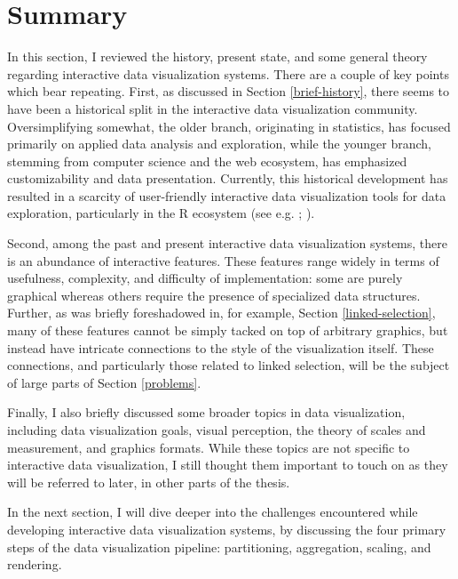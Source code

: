 \documentclass[
  openany]{book}
\theoremstyle{definition}
\theoremstyle{definition}
\theoremstyle{definition}
\theoremstyle{definition}
\theoremstyle{remark}
\begin{document}
\section{Summary}\label{summary}

In this section, I reviewed the history, present state, and some general theory regarding interactive data visualization systems. There are a couple of key points which bear repeating. First, as discussed in Section \ref{brief-history}, there seems to have been a historical split in the interactive data visualization community. Oversimplifying somewhat, the older branch, originating in statistics, has focused primarily on applied data analysis and exploration, while the younger branch, stemming from computer science and the web ecosystem, has emphasized customizability and data presentation. Currently, this historical development has resulted in a scarcity of user-friendly interactive data visualization tools for data exploration, particularly in the R ecosystem (see e.g. ; ).

Second, among the past and present interactive data visualization systems, there is an abundance of interactive features. These features range widely in terms of usefulness, complexity, and difficulty of implementation: some are purely graphical whereas others require the presence of specialized data structures. Further, as was briefly foreshadowed in, for example, Section \ref{linked-selection}, many of these features cannot be simply tacked on top of arbitrary graphics, but instead have intricate connections to the style of the visualization itself. These connections, and particularly those related to linked selection, will be the subject of large parts of Section \ref{problems}.

Finally, I also briefly discussed some broader topics in data visualization, including data visualization goals, visual perception, the theory of scales and measurement, and graphics formats. While these topics are not specific to interactive data visualization, I still thought them important to touch on as they will be referred to later, in other parts of the thesis.

In the next section, I will dive deeper into the challenges encountered while developing interactive data visualization systems, by discussing the four primary steps of the data visualization pipeline: partitioning, aggregation, scaling, and rendering.
\end{document}
